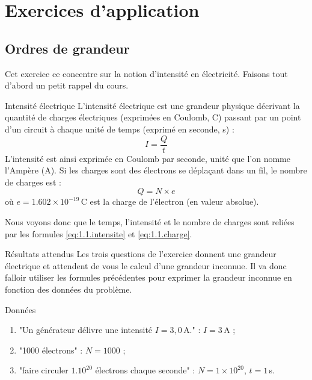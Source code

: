 \documentclass[10pt,a5paper,notitlepage]{book}
\begin{document}
\section{Exercices d'application}
\subsection{Ordres de grandeur}

Cet exercice ce concentre sur la notion d'intensité en électricité. Faisons tout d'abord un petit rappel du cours.

\begin{defi}{Intensité électrique}
	L'intensité électrique est une grandeur physique décrivant la quantité de charges électriques (exprimées en Coulomb, C) passant par un point d'un circuit à chaque unité de temps (exprimé en seconde, s) :
	\begin{equation}
		I = \dfrac{Q}{t} \label{eq:1.1.intensite}
	\end{equation}
	L'intensité est ainsi exprimée en Coulomb par seconde, unité que l'on nomme l'Ampère (A). Si les charges sont des électrons se déplaçant dans un fil, le nombre de charges est :
	\begin{equation}
		Q = N\times e \label{eq:1.1.charge}
	\end{equation}
	où $e = 1.602\times 10^{-19}\,$C est la charge de l'électron (en valeur absolue).
\end{defi}

Nous voyons donc que le temps, l'intensité et le nombre de charges sont reliées par les formules \ref{eq:1.1.intensite} et \ref{eq:1.1.charge}.

\begin{NCprop}{Résultats attendus}
	Les trois questions de l'exercice donnent une grandeur électrique et attendent de vous le calcul d'une grandeur inconnue. Il va donc falloir utiliser les formules précédentes pour exprimer la grandeur inconnue en fonction des données du problème.
\end{NCprop}

\begin{NCdefi}{Données}
	\begin{enumerate}
		\item "Un générateur délivre une intensité $I = 3,0\,$A." : $I = 3\,$A ;
		\item "1000 électrons" : $N = 1000$ ;
		\item "faire circuler $1.10^{20}$ électrons chaque seconde" : $N = 1\times 10^{20}$, $t = 1\,$s.
	\end{enumerate}
\end{NCdefi}
\end{document}
